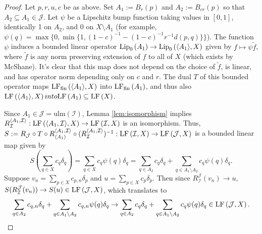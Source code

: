 \documentclass[12pt]{amsart}
\theoremstyle{definition}
\numberwithin{equation}{section}
\def \I {\mathcal{I}}
\def \J {\mathcal{J}}
\def \comp {\circ}
\def \sbs {\subseteq}
\newcommand{\ulm}[1]{\mathrm{ulm}\left(#1\right)}
\begin{document}
\begin{proof}
Let $p,r,u,c$ be as above. Set $A_1 := B_{r}(p)$ and $A_2 := B_{cr}(p)$ so that $A_2 \sbs A_1 \in \J$. Let $\psi$ be a Lipschitz bump function taking values in $[0,1]$, identically 1 on $A_2$, and 0 on $X \setminus A_1$ (for example, $\psi(q) = \max\{0,\min\{1,(1-c)^{-1}-(1-c)^{-1}r^{-1}d(p,q)\}\}$). The function $\psi$ induces a bounded linear operator $\Lip{A_1} \to \Lip{\langle A_1 \rangle}{X}$ given by $f \mapsto \psi\tilde{f}$, where $\tilde{f}$ is any norm preserving extension of $f$ to all of $X$ (which exists by McShane). It's clear that this map does not depend on the choice of $\tilde{f}$, is linear, and has operator norm depending only on $c$ and $r$. The dual $T$ of this bounded operator maps $\LFf{\langle A_1 \rangle}{X}$ into $\LFf{A_1}$, and thus also $\LF{\langle A_1 \rangle}{X} into \LF{A_1} \sbs \LF{X}$.

Since $A_1 \in \J = \ulm{\I}$, Lemma \ref{lem:isomorphism} implies $R^{\langle A_1,\I \rangle}_\I: \LF{\langle A_1,\I \rangle}{X} \to \LF{\I}{X}$ is an isomorphism. Thus, $S := R_\J \comp T \comp R^{\langle A_1,\I \rangle}_{\langle A_1 \rangle} \comp (R^{\langle A_1,\I \rangle}_{\I})^{-1}: \LF{\I}{X} \to \LF{\J,X}$ is a bounded linear map given by
$$S\left(\sum_{q \in X} c_q\delta_q\right) = \sum_{q \in X} c_q\psi(q)\delta_q = \sum_{q \in A_2} c_q\delta_q + \sum_{q \in A_1 \setminus A_2} c_q\psi(q)\delta_q.$$
Suppose $v_n = \sum_{p \in X} c_{p,n}\delta_p$ and $u = \sum_{p \in X} c_p\delta_p$. Then since $R^\J_\I(v_n) \to u$, $S(R^\J_\I(v_n)) \to S(u) \in \LF{\J}{X}$, which translates to
$$\sum_{q \in A_2} c_{q,n}\delta_{q} + \sum_{q \in A_1 \setminus A_2} c_{q,n}\psi(q)\delta_q \to \sum_{q \in A_2} c_{q}\delta_{q} + \sum_{q \in A_1 \setminus A_2} c_{q}\psi(q)\delta_q \in \LF{\J}{X}.$$


\end{proof}
\end{document}
